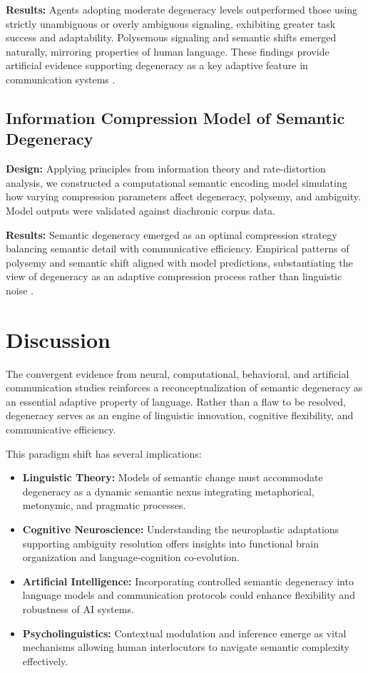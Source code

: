 \documentclass[12pt,a4paper]{article}
\begin{document}
\textbf{Results:} Agents adopting moderate degeneracy levels outperformed those using strictly unambiguous or overly ambiguous signaling, exhibiting greater task success and adaptability. Polysemous signaling and semantic shifts emerged naturally, mirroring properties of human language. These findings provide artificial evidence supporting degeneracy as a key adaptive feature in communication systems \cite{citation_needed}.

\subsection{Information Compression Model of Semantic Degeneracy}

\textbf{Design:} Applying principles from information theory and rate-distortion analysis, we constructed a computational semantic encoding model simulating how varying compression parameters affect degeneracy, polysemy, and ambiguity. Model outputs were validated against diachronic corpus data.

\textbf{Results:} Semantic degeneracy emerged as an optimal compression strategy balancing semantic detail with communicative efficiency. Empirical patterns of polysemy and semantic shift aligned with model predictions, substantiating the view of degeneracy as an adaptive compression process rather than linguistic noise \cite{citation_needed}.

\section{Discussion}

The convergent evidence from neural, computational, behavioral, and artificial communication studies reinforces a reconceptualization of semantic degeneracy as an essential adaptive property of language. Rather than a flaw to be resolved, degeneracy serves as an engine of linguistic innovation, cognitive flexibility, and communicative efficiency.

This paradigm shift has several implications:

\begin{itemize}
    \item {\bf Linguistic Theory:} Models of semantic change must accommodate degeneracy as a dynamic semantic nexus integrating metaphorical, metonymic, and pragmatic processes.
    \item {\bf Cognitive Neuroscience:} Understanding the neuroplastic adaptations supporting ambiguity resolution offers insights into functional brain organization and language-cognition co-evolution.
    \item {\bf Artificial Intelligence:} Incorporating controlled semantic degeneracy into language models and communication protocols could enhance flexibility and robustness of AI systems.
    \item {\bf Psycholinguistics:} Contextual modulation and inference emerge as vital mechanisms allowing human interlocutors to navigate semantic complexity effectively.
\end{itemize}
\end{document}
